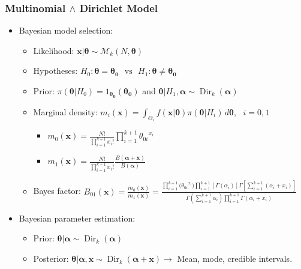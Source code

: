 \begin{frame}
\frametitle{Multinomial $\land$ Dirichlet Model}

\begin{itemize}

\item Bayesian model selection:

\begin{itemize}

\item Likelihood: $\bm{x}|\bm{\theta} \sim \mathcal{M}_k(N,\bm{\theta})$

\item Hypotheses:  $ H_0: \bm{\theta}=\bm{\theta_0} \,\,\,\, \text{vs} \,\,\,\,  H_1: \bm{\theta} \neq \bm{\theta_0}$

\item Prior: $\pi(\bm{\theta}|H_0)={1_{\bm{\theta_0}}(\bm{\theta_0})}$ and $\bm{\theta}|H_1, \bm{\alpha} \sim \operatorname{Dir}_k(\bm{\alpha})$ 

\item Marginal density: $m_i(\bm{x})=\int_{\Theta_i} f(\bm{x}|\bm{\theta})\pi(\bm{\theta}|H_i) \, d\bm{\theta} $, \, $i=0,1$

\begin{itemize}

\item  $m_0(\bm{x})=\frac{N!}{\prod_{i=1}^{k+1}x_i!}\prod_{i=1}^{k+1}{\theta_{0i}}^{x_i}$ 
\item  $m_1(\bm{x})= \frac{N!}{\prod_{i=1}^{k+1}x_i!}\frac{B(\bm{\alpha}+\bm{x})}{B(\bm{\alpha})}$ 

\end{itemize}

\item Bayes factor: $B_{01}(\bm{x}) = \frac{m_0(\bm{x})}{m_1(\bm{x})} = \frac{\prod_{i=1}^{k+1}{(\theta_{0i}}^{x_i}) \prod_{i=1}^{k+1}[\Gamma(\alpha_i)] \Gamma [\sum_{i=1}^{k+1}(\alpha_i+x_i)]}{\Gamma(\sum_{i=1}^{k+1} \alpha_i) \prod_{i=1}^{k+1}\Gamma(\alpha_i+x_i)}$

\end{itemize}	

\item Bayesian parameter estimation:

\begin{itemize}

\item Prior: $\bm{\theta}|\bm{\alpha} \sim \operatorname{Dir}_k(\bm{\alpha})$

\item Posterior: $\bm{\theta} | \bm{\alpha}, \bm{x} \sim \operatorname{Dir}_k(\bm{\alpha} + \bm{x}) \rightarrow$ Mean, mode, credible intervals.

\end{itemize}

\end{itemize}

\end{frame}

